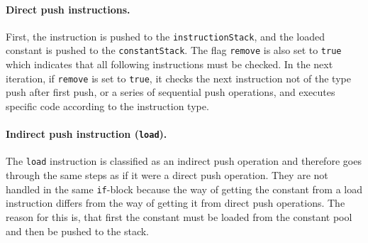 %

\paragraph{Direct push instructions.}
First, the instruction is pushed to the \texttt{instructionStack}, and the loaded constant is pushed to the \texttt{constantStack}. The flag \texttt{remove} is also set to \texttt{true} which indicates that all following instructions must be checked.     
In the next iteration, if \texttt{remove} is set to \texttt{true}, it checks the next instruction not of the type push after first push, or a series of sequential push operations, and executes specific code according to the instruction type.

%

\paragraph{Indirect push instruction (\texttt{load}).}
The \texttt{load} instruction is classified as an indirect push operation and therefore goes through the same steps as if it were a direct push operation. They are not handled in the same \texttt{if}-block because the way of getting the constant from a load instruction differs from the way of getting it from direct push operations. The reason for this is, that first the constant must be loaded from the constant pool and then be pushed to the stack.

%

